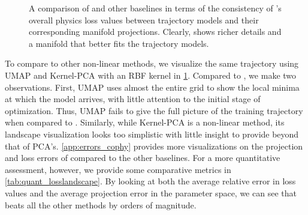 \documentclass[letterpaper]{article} %
\begin{document}
\begin{figure}[htbp]
             
              \caption{A comparison of \proposedautencoder{} and other baselines in terms of the consistency of \cophy{}'s overall physics loss values between trajectory models and their corresponding manifold projections. 
              Clearly, \proposedautencoder{} shows richer details and a manifold that better fits the trajectory models.}
              \label{fig:PCAvsAE}
            \end{figure}




          To compare \proposedautencoder{} to other non-linear methods, we visualize the same trajectory using UMAP \cite{mcinnes2018umap} and Kernel-PCA \cite{10.1007/BFb0020217} with an RBF kernel in 
          \cref{fig:PCAvsAE}. Compared to \proposedautencoder{}, we make two observations. First, UMAP uses almost the entire grid to show the local minima at which the model arrives, with little attention to the initial stage of optimization. Thus, UMAP fails to give the full picture of the training trajectory when compared to \proposedautencoder{}. Similarly, while Kernel-PCA is a non-linear method, its landscape visualization looks too simplistic with little insight to provide beyond that of PCA's. 
                    \cref{app:errors_cophy} provides more visualizations on the projection and loss errors of \proposedautencoder{} compared to the other baselines. For a more quantitative assessment, however, we provide some comparative metrics in \cref{tab:quant_losslandscape}. By looking at both the average relative error in loss values and the average projection error in the parameter space, we can see that \proposedautencoder{} beats all the other methods by orders of magnitude.
\end{document}
